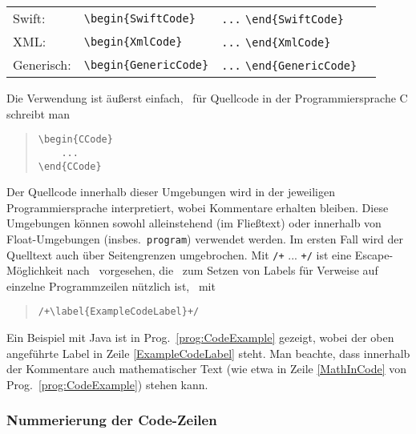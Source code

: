 \begin{table}
\begin{tabular}{llll}
	Swift: & \verb!\begin{SwiftCode}! & \verb!...! \verb!\end{SwiftCode}! \\
	XML: & \verb!\begin{XmlCode}! & \verb!...! \verb!\end{XmlCode}! \\
	Generisch: & \verb!\begin{GenericCode}! & \verb!...! \verb!\end{GenericCode}! \\
	\hline
\end{tabular}
\end{table}
%
Die Verwendung ist äußerst einfach, \zB\ für Quellcode in der Programmiersprache C schreibt man
%
\begin{quote}
\begin{verbatim}
\begin{CCode}
    ... 
\end{CCode}
\end{verbatim}
\end{quote}
%
Der Quellcode innerhalb dieser Umgebungen wird in der jeweiligen Programmiersprache interpretiert, wobei Kommentare erhalten bleiben. Diese Umgebungen können sowohl alleinstehend (im Fließtext) oder innerhalb von Float-Umgebungen (insbes.\ \texttt{program}) verwendet werden. Im ersten Fall wird der Quelltext auch über Seitengrenzen umgebrochen. Mit \verb!/+! ... \verb!+/! ist eine Escape-Möglichkeit nach \latex\ vorgesehen, die \va\ zum Setzen von Labels für Verweise auf einzelne Programmzeilen nützlich ist, \zB\ mit
%
\begin{quote}
\verb!/+\label{ExampleCodeLabel}+/!
\end{quote}
%
Ein Beispiel mit Java ist in Prog.~\ref{prog:CodeExample} gezeigt, wobei der oben angeführte Label in Zeile \ref{ExampleCodeLabel} steht.
Man beachte, dass innerhalb der Kommentare auch mathematischer Text 
(wie etwa in Zeile \ref{MathInCode} von Prog.~\ref{prog:CodeExample}) stehen kann.


\subsubsection{Nummerierung der Code-Zeilen}


